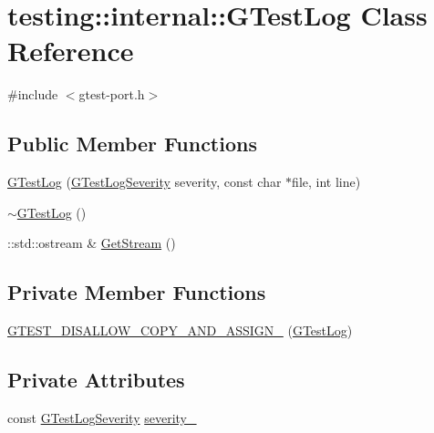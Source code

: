 \hypertarget{classtesting_1_1internal_1_1GTestLog}{}\section{testing\+:\+:internal\+:\+:G\+Test\+Log Class Reference}
\label{classtesting_1_1internal_1_1GTestLog}


{\ttfamily \#include $<$gtest-\/port.\+h$>$}

\subsection*{Public Member Functions}
\begin{DoxyCompactItemize}
\item 
\hyperlink{classtesting_1_1internal_1_1GTestLog_a364691bf972983a59cfa2891062a64af}{G\+Test\+Log} (\hyperlink{namespacetesting_1_1internal_aa6255ef3b023c5b4e1a2198d887fb977}{G\+Test\+Log\+Severity} severity, const char $\ast$file, int line)
\item 
\hyperlink{classtesting_1_1internal_1_1GTestLog_a978a099703bbaa0f380216e8d7ee03d3}{$\sim$\+G\+Test\+Log} ()
\item 
\+::std\+::ostream \& \hyperlink{classtesting_1_1internal_1_1GTestLog_aebb92e67d98eca69f0347d5121dab27a}{Get\+Stream} ()
\end{DoxyCompactItemize}
\subsection*{Private Member Functions}
\begin{DoxyCompactItemize}
\item 
\hyperlink{classtesting_1_1internal_1_1GTestLog_ab6032a126d36a80163fdcd406fce3aad}{G\+T\+E\+S\+T\+\_\+\+D\+I\+S\+A\+L\+L\+O\+W\+\_\+\+C\+O\+P\+Y\+\_\+\+A\+N\+D\+\_\+\+A\+S\+S\+I\+G\+N\+\_\+} (\hyperlink{classtesting_1_1internal_1_1GTestLog}{G\+Test\+Log})
\end{DoxyCompactItemize}
\subsection*{Private Attributes}
\begin{DoxyCompactItemize}
\item 
const \hyperlink{namespacetesting_1_1internal_aa6255ef3b023c5b4e1a2198d887fb977}{G\+Test\+Log\+Severity} \hyperlink{classtesting_1_1internal_1_1GTestLog_ad8f75f5845900d0d2fd3cbb048a861be}{severity\+\_\+}
\end{DoxyCompactItemize}



